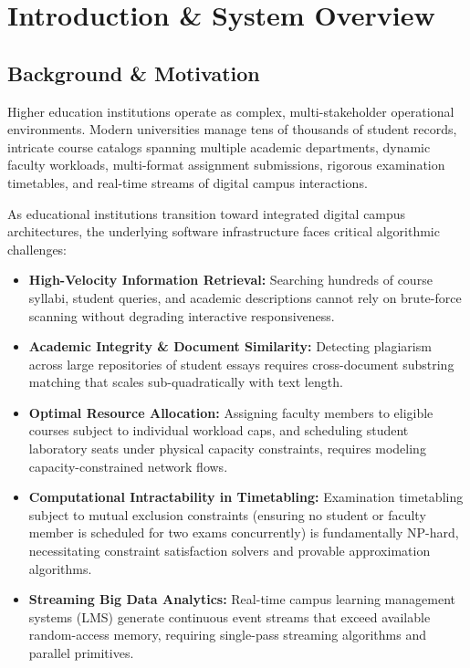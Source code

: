 \chapter{Introduction \& System Overview}
\label{ch:introduction}

\section{Background \& Motivation}
Higher education institutions operate as complex, multi-stakeholder operational environments. Modern universities manage tens of thousands of student records, intricate course catalogs spanning multiple academic departments, dynamic faculty workloads, multi-format assignment submissions, rigorous examination timetables, and real-time streams of digital campus interactions.

As educational institutions transition toward integrated digital campus architectures, the underlying software infrastructure faces critical algorithmic challenges:
\begin{itemize}
    \item \textbf{High-Velocity Information Retrieval:} Searching hundreds of course syllabi, student queries, and academic descriptions cannot rely on brute-force scanning without degrading interactive responsiveness.
    \item \textbf{Academic Integrity \& Document Similarity:} Detecting plagiarism across large repositories of student essays requires cross-document substring matching that scales sub-quadratically with text length.
    \item \textbf{Optimal Resource Allocation:} Assigning faculty members to eligible courses subject to individual workload caps, and scheduling student laboratory seats under physical capacity constraints, requires modeling capacity-constrained network flows.
    \item \textbf{Computational Intractability in Timetabling:} Examination timetabling subject to mutual exclusion constraints (ensuring no student or faculty member is scheduled for two exams concurrently) is fundamentally NP-hard, necessitating constraint satisfaction solvers and provable approximation algorithms.
    \item \textbf{Streaming Big Data Analytics:} Real-time campus learning management systems (LMS) generate continuous event streams that exceed available random-access memory, requiring single-pass streaming algorithms and parallel primitives.
\end{itemize}


